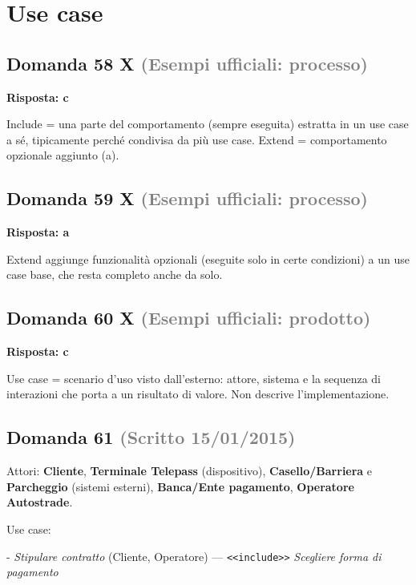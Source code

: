 \documentclass[a4paper,11pt]{article}
\begin{document}
\section{Use case}

\subsection*{Domanda 58 X \hfill {\small \textcolor{gray}{(Esempi ufficiali: processo)}}}
\textbf{Risposta: c}\par
Include = una parte del comportamento (sempre eseguita) estratta in un use case a sé, tipicamente perché condivisa da più use case. Extend = comportamento opzionale aggiunto (a).



\subsection*{Domanda 59 X \hfill {\small \textcolor{gray}{(Esempi ufficiali: processo)}}}
\textbf{Risposta: a}\par
Extend aggiunge funzionalità opzionali (eseguite solo in certe condizioni) a un use case base, che resta completo anche da solo.



\subsection*{Domanda 60 X \hfill {\small \textcolor{gray}{(Esempi ufficiali: prodotto)}}}
\textbf{Risposta: c}\par
Use case = scenario d'uso visto dall'esterno: attore, sistema e la sequenza di interazioni che porta a un risultato di valore. Non descrive l'implementazione.



\subsection*{Domanda 61 \hfill {\small \textcolor{gray}{(Scritto 15/01/2015)}}}
Attori: \textbf{Cliente}, \textbf{Terminale Telepass} (dispositivo), \textbf{Casello/Barriera} e \textbf{Parcheggio} (sistemi esterni), \textbf{Banca/Ente pagamento}, \textbf{Operatore Autostrade}.

Use case:

- \textit{Stipulare contratto} (Cliente, Operatore) — \texttt{\textless{}\textless{}include\textgreater{}\textgreater{}} \textit{Scegliere forma di pagamento}
\end{document}

